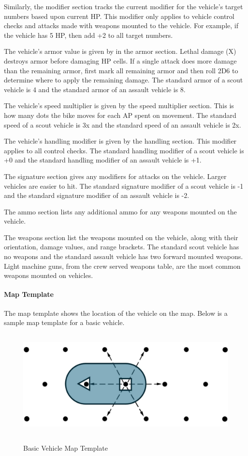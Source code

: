 Similarly, the modifier section tracks the current modifier for the vehicle's target numbers based upon current HP.
This modifier only applies to vehicle control checks and attacks made with weapons mounted to the vehicle.
For example, if the vehicle has 5 HP, then add +2 to all target numbers.

The vehicle's armor value is given by in the armor section.
Lethal damage (X) destroys armor before damaging HP cells.
If a single attack does more damage than the remaining armor, first mark all remaining armor and then roll 2D6 to determine where to apply the remaining damage.
The standard armor of a scout vehicle is 4 and the standard armor of an assault vehicle is 8.

The vehicle's speed multiplier is given by the speed multiplier section.
This is how many dots the bike moves for each AP spent on movement.
The standard speed of a scout vehicle is 3x and the standard speed of an assault vehicle is 2x.

The vehicle's handling modifier is given by the handling section.
This modifier applies to all control checks.
The standard handling modifier of a scout vehicle is +0 and the standard handling modifier of an assault vehicle is +1.

The signature section gives any modifiers for attacks on the vehicle.
Larger vehicles are easier to hit.
The standard signature modifier of a scout vehicle is -1 and the standard signature modifier of an assault vehicle is -2.

The ammo section lists any additional ammo for any weapons mounted on the vehicle.

The weapons section list the weapons mounted on the vehicle, along with their orientation, damage values, and range brackets.
The standard scout vehicle has no weapons and the standard assault vehicle has two forward mounted weapons.
Light machine guns, from the crew served weapons table, are the most common weapons mounted on vehicles.

\paragraph*{Map Template}

The map template shows the location of the vehicle on the map.
Below is a sample map template for a basic vehicle.

\begin{figure}[H]
  \centering
  \includegraphics[alt='Sample Vehicle Map Template', width=5.25in, height=2.15in]{img/MapVehicle.png}
  \caption*{Basic Vehicle Map Template}
\end{figure}

